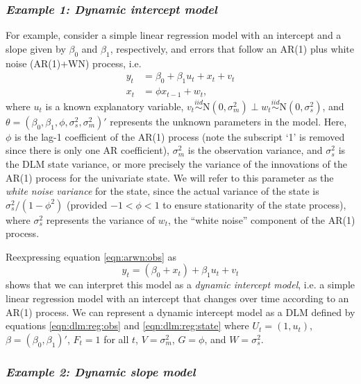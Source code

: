 \subsubsection{\emph{Example 1: Dynamic intercept model} \label{sec:dlm:M101}}

For example, consider a simple linear regression model with an intercept and a slope given by $\beta_0$ and $\beta_1$, respectively, and errors that follow an AR(1) plus white noise (AR(1)+WN) process, i.e.
\begin{align}
y_t &= \beta_0 + \beta_1u_t + x_t + v_t \label{eqn:arwn:obs} \\
x_t &= \phi x_{t-1} + w_t, \label{eqn:arwn:state}
\end{align}
where $u_t$ is a known explanatory variable, $v_t \stackrel{iid}{\sim} \mbox{N}(0, \sigma^2_m) \perp w_t \stackrel{iid}{\sim} \mbox{N}(0, \sigma^2_s)$, and $\theta = (\beta_0,\beta_1,\phi,\sigma^2_s,\sigma^2_m)'$ represents the unknown parameters in the model. Here, $\phi$ is the lag-1 coefficient of the AR(1) process (note the subscript `1' is removed since there is only one AR coefficient), $\sigma^2_m$ is the observation variance, and $\sigma^2_s$ is the DLM state variance, or more precisely the variance of the innovations of the AR(1) process for the univariate state. We will refer to this parameter as the \emph{white noise variance} for the state, since the actual variance of the state is $\sigma^2_s / (1 - \phi^2)$ (provided $-1 < \phi < 1$ to ensure stationarity of the state process), where $\sigma^2_s$ represents the variance of $w_t$, the ``white noise'' component of the AR(1) process.

Reexpressing equation \eqref{eqn:arwn:obs} as
\begin{equation}
y_t = (\beta_0 + x_t) + \beta_1u_t + v_t \label{eqn:arwn:dynint}
\end{equation}
shows that we can interpret this model as a \emph{dynamic intercept model}, i.e. a simple linear regression model with an intercept that changes over time according to an AR(1) process. We can represent a dynamic intercept model as a DLM defined by equations \eqref{eqn:dlm:reg:obs} and \eqref{eqn:dlm:reg:state} where $U_t = (1, u_t)$, $\beta = (\beta_0, \beta_1)'$, $F_t = 1$ for all $t$, $V = \sigma^2_m$, $G = \phi$, and $W = \sigma^2_s$.

\subsubsection{\emph{Example 2: Dynamic slope model} \label{sec:dlm:M011}}

